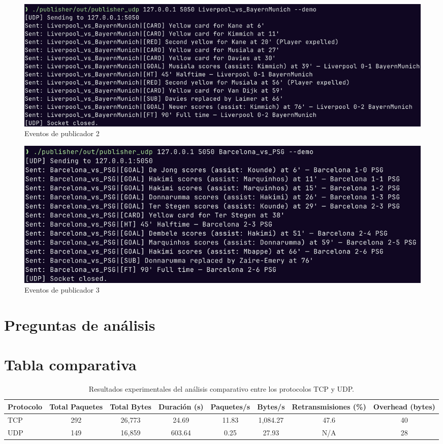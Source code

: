 \documentclass[10pt]{article}
\begin{document}
\begin{figure}[H]
    \centering
    \includegraphics[width=.85\textwidth]{screenshots/udp-screenshots/pub2.png}
    \caption{Eventos de publicador 2}
\end{figure} 

\begin{figure}[H]
    \centering
    \includegraphics[width=.85\textwidth]{screenshots/udp-screenshots/pub3.png}
    \caption{Eventos de publicador 3}
\end{figure} 
























\section{Preguntas de análisis}
\section{Tabla comparativa}
\begin{table}[H]
\centering
\begin{tabular}{|l|c|c|c|c|c|c|c|}
\hline
\textbf{Protocolo} & \textbf{Total Paquetes} & \textbf{Total Bytes} & \textbf{Duración (s)} & \textbf{Paquetes/s} & \textbf{Bytes/s} & \textbf{Retransmisiones (\%)} & \textbf{Overhead (bytes)} \\ \hline
TCP & 292 & 26,773 & 24.69 & 11.83 & 1,084.27 & 47.6 & 40 \\ \hline
UDP & 149 & 16,859 & 603.64 & 0.25 & 27.93 & N/A & 28 \\ \hline
\end{tabular}
\caption{Resultados experimentales del análisis comparativo entre los protocolos TCP y UDP.}
\label{tab:tcp_udp_overhead}
\end{table}
\end{document}
